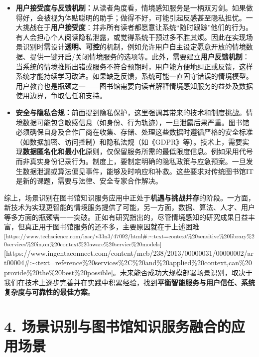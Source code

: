 \documentclass[
  letterpaper,
]{scrbook}
\begin{document}
\begin{itemize}
\item
  \textbf{用户接受度与反馈机制：}从读者角度看，情境感知服务是一柄双刃剑。如果做得好，会被视为体贴聪明的助手；做得不好，可能引起反感甚至隐私担忧。一大挑战在于\textbf{用户接受度}：并非所有读者都愿意让系统``随时跟踪''他们的行为。有人会担心个人阅读隐私泄露，或觉得系统干预过多不胜其烦。因此在实现场景识别时需设计\textbf{透明、可控}的机制，例如允许用户自主设定愿意开放的情境数据、提供一键开启/关闭情境服务的选项等。此外，需要建立\textbf{用户反馈机制}：当系统的情境推断出错或服务不符合预期时，用户能方便地纠正或反馈，这样系统才能持续学习改进。如果缺乏反馈，系统可能一直固守错误的情境模型。用户教育也是瓶颈之一------图书馆需要向读者解释情境感知服务的益处及数据使用边界，争取信任和支持。
\item
  \textbf{安全与隐私合规：}前面提到隐私保护，这里强调其带来的技术和制度挑战。情境数据可能包含敏感信息（如身份、行为轨迹），一旦泄露后果严重。图书馆必须确保自身及合作厂商在收集、存储、处理这些数据时遵循严格的安全标准（如数据加密、访问控制）和隐私法规（如《GDPR》等）。技术上，需要实现\textbf{数据匿名化和最小化}原则，仅保留服务所需的最低限度信息。例如采用代号而非真实身份记录行为。制度上，要制定明确的隐私政策与应急预案。一旦发生数据泄漏或算法偏见事件，能够及时响应和补救。这些要求对传统图书馆IT是新的课题，需要与法律、安全专家合作解决。
\end{itemize}

综上，场景识别在图书馆知识服务应用中正处于\textbf{机遇与挑战并存}的阶段。一方面，新技术为实现更智能的情境服务提供了可能，另一方面，数据、算法、人才、用户等多方面的瓶颈需一一突破。正如有研究指出的，尽管情境感知的研究成果日益丰富，但真正用于图书馆服务的还不多，主要原因就在于上述困难\textsuperscript{{[}https://www.techscience.com/iasc/v33n3/47092/html\#:\textasciitilde:text=context\%20sensitive\%20library\%20services\%20in,on\%20context\%20aware\%20service\%20models{]}}{[}https://www.ingentaconnect.com/content/mcb/238/2013/00000031/00000002/art00004\#:\textasciitilde:text=reference\%20services\%2C\%20and\%20applied\%20context,can\%20provide\%20the\%20best\%20possible{]}。未来能否成功大规模部署场景识别，取决于我们在技术上逐步完善并在实践中积累经验，找到\textbf{平衡智能服务与用户信任、系统复杂度与可靠性的最佳方案}。

\section{4.
场景识别与图书馆知识服务融合的应用场景}\label{ux573aux666fux8bc6ux522bux4e0eux56feux4e66ux9986ux77e5ux8bc6ux670dux52a1ux878dux5408ux7684ux5e94ux7528ux573aux666f}
\end{document}
